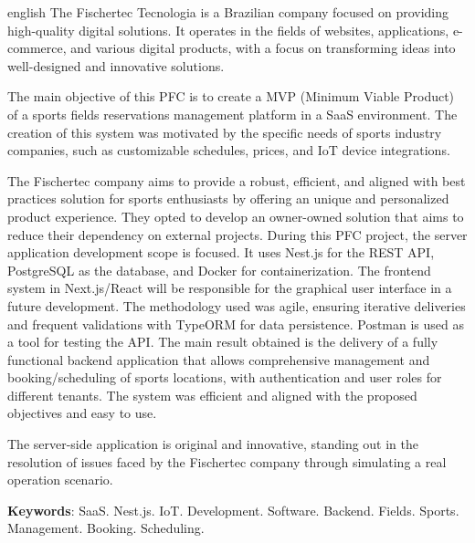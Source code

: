 
\begin{resumo}[Abstract]
	\SingleSpacing
	\begin{otherlanguage*}{english}
		The Fischertec Tecnologia is a Brazilian company focused on providing high-quality digital solutions. It operates in the fields of websites, applications, e-commerce, and various digital products, with a focus on transforming ideas into well-designed and innovative solutions.

		The main objective of this PFC is to create a MVP (Minimum Viable Product) of a sports fields reservations management platform in a SaaS environment. The creation of this system was motivated by the specific needs of sports industry companies, such as customizable schedules, prices, and IoT device integrations.

		The Fischertec company aims to provide a robust, efficient, and aligned with best practices solution for sports enthusiasts by offering an unique and personalized product experience. They opted to develop an owner-owned solution that aims to reduce their dependency on external projects.
		During this PFC project, the server application development scope is focused. It uses Nest.js for the REST API, PostgreSQL as the database, and Docker for containerization. The frontend system in Next.js/React will be responsible for the graphical user interface in a future development.
		The methodology used was agile, ensuring iterative deliveries and frequent validations with TypeORM for data persistence. Postman is used as a tool for testing the API.
		The main result obtained is the delivery of a fully functional backend application that allows comprehensive management and booking/scheduling of sports locations, with authentication and user roles for different tenants. The system was efficient and aligned with the proposed objectives and easy to use.

		The server-side application is original and innovative, standing out in the resolution of issues faced by the Fischertec company through simulating a real operation scenario.
		
		\textbf{Keywords}: SaaS. Nest.js. IoT. Development. Software. Backend. Fields. Sports. Management. Booking. Scheduling.
	\end{otherlanguage*}
\end{resumo}

